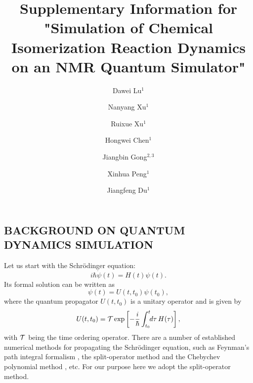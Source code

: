 \documentclass[twocolumn,showpacs,twoside,10pt,prl]{revtex4}
\newcommand{\be}{\begin{equation}}
\newcommand{\ee}{\end{equation}}
\begin{document}
\title{Supplementary Information for "Simulation of Chemical Isomerization Reaction Dynamics on an NMR Quantum Simulator"}
\author{Dawei Lu$^{1}$}
\author{Nanyang Xu$^{1}$}
\author{Ruixue Xu$^{1}$}
\author{Hongwei Chen$^{1}$}
\author{Jiangbin Gong$^{2,3}$}
\author{Xinhua Peng$^{1}$}
\author{Jiangfeng Du$^{1}$}




\maketitle




\subsection*{BACKGROUND ON QUANTUM DYNAMICS SIMULATION}



Let us start with the Schr\"{o}dinger equation:
\be
 i\hbar \dot\psi(t)=  H(t)\psi(t).
\ee
Its formal solution can be written as
\be
   \psi(t)=   U(t,t_0)\psi(t_0),
\ee
where the quantum propagator $U(t,t_0)$ is a unitary operator and is given by
\be
     U(t,t_0)={\cal T}\exp\left[-\frac{i}{\hbar}
  \int_{t_0}^t\!\!d\tau\,   H(\tau)\right],
\ee
with ${\cal T}$ being the time ordering operator.  There are a number of established numerical methods for propagating the Schr\"{o}dinger equation,
such as Feynman's path integral formalism \cite{Feynman2},
the split-operator method \cite{Feit2} and the Chebychev polynomial method \cite{Kosloff,Zhangbook2}, etc.  For our purpose here we adopt the split-operator method.
\end{document}
